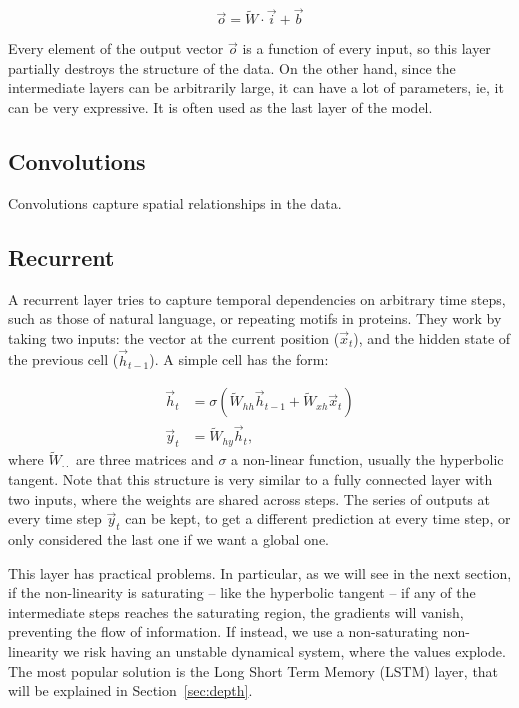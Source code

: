 \begin{equation*}
\vec{o} = \widetilde W \cdot \vec{i} + \vec{b}
\end{equation*}

Every element of the output vector $\vec o$ is a function of every input, so this layer partially destroys the structure of the data.
On the other hand, since the intermediate layers can be arbitrarily large, it can have a lot of parameters, ie, it can be very expressive.
It is often used as the last layer of the model.

\subsection{Convolutions}
Convolutions capture spatial relationships in the data.

\subsection{Recurrent}
A recurrent layer tries to capture temporal dependencies on arbitrary time steps, such as those of natural language, or repeating motifs in proteins.
They work by taking two inputs: the vector at the current position ($\vec x_t$), and the hidden state of the previous cell ($\vec h_{t-1}$).
A simple cell has the form:

\begin{align*}
\vec h_t &= \sigma\left(\widetilde W_{hh} \vec{h}_{t-1} + \widetilde W_{xh} \vec{x}_{t}\right) \\
\vec y_t &=  \widetilde W_{hy} \vec h_t,
\end{align*}
where $ \widetilde W_{\cdot \cdot}$ are three matrices and $\sigma$ a non-linear function, usually the hyperbolic tangent.
Note that this structure is very similar to a fully connected layer with two inputs, where the weights are shared across steps.
The series of outputs at every time step $\vec y_t$ can be kept, to get a different prediction at every time step, or only considered the last one if we want a global one.

This layer has practical problems. 
In particular, as we will see in the next section, if the non-linearity is saturating -- like the hyperbolic tangent -- if any of the intermediate steps reaches the saturating region, the gradients will vanish, preventing the flow of information.
If instead, we use a non-saturating non-linearity we risk having an unstable dynamical system, where the values explode.
The most popular solution  is the Long Short Term Memory (LSTM) layer, that will be explained in Section~\ref{sec:depth}.



